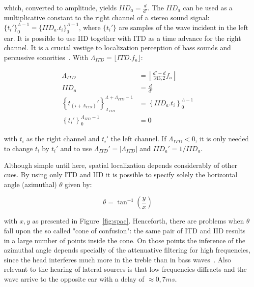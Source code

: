 \documentclass[
 aip,
 jmp,
 amsmath,amssymb,
 reprint,
]{revtex4-1}
\begin{document}
\noindent which, converted to amplitude, yields $IID_a=\frac{d}{d'}$. The $IID_a$ can be used as a multiplicative constant to the right channel of a stereo sound signal: $\{t_i'\}_0^{\Lambda -1}=\{IID_a . t_i\}_0^{\Lambda -1}$, where $\{t_i'\}$ are samples of the wave incident in the left ear. It is possible to use IID together with ITD as a time advance for the right channel. It is a crucial vestige to localization perception of bass sounds and percussive sonorities~\cite{Heeger}. 
With $\Lambda_{ITD}=\lfloor ITD . f_a \rfloor$:

\begin{equation}\label{eq:locImpl}
\begin{split}
\Lambda_{ITD} & = \left \lfloor \frac{d'-d}{343,2}  f_a \right \rfloor \\
IID_a & = \frac{d}{d'} \\
\left\{t_{(i+\Lambda_{ITD})}'\right\}_{\Lambda_{ITD}}^{\Lambda+\Lambda_{ITD}-1} & =\left\{IID_a . t_i\right\}_0^{\Lambda-1} \\
\left\{t_i'\right\}_0^{\Lambda_{ITD}-1} & = 0
\end{split}
\end{equation}

\noindent with $t_i$ as the right channel and $t_i'$ the left channel. If $\Lambda_{ITD} < 0 $, it is only needed to change $t_i$ by $t_i'$ and to use $\Lambda_{ITD}'= | \Lambda_{ITD} | $ and $IID_a'=1 / IID_a$.

Although simple until here, spatial localization depends considerably of other cues. By using only ITD and IID it is possible to specify solely the horizontal angle (azimuthal) $\theta$ given by:

\begin{equation}\label{eq:angulo}
\theta=\tan^{-1}\left ( \frac{y}{ x }  \right )
\end{equation}

\noindent with $x,y$ as presented in Figure~\ref{fig:spac}. Henceforth, there are problems when $\theta$ fall upon the so called "cone of confusion": the same pair of ITD and IID results in a large number of points inside the cone. On those points the inference of the azimuthal angle depends specially of the attenuative filtering for high frequencies, since the head interferes much more in the treble than in bass waves~\cite{Heeger,hrtf}. Also relevant to the hearing of lateral sources is that low frequencies diffracts and the wave arrive to the opposite ear with a delay of $\approx 0,7ms$.\cite{floEsp}
\end{document}
